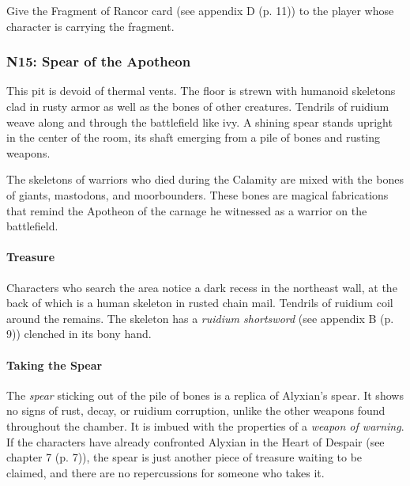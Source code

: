 \documentclass[a4paper, 11pt, bg=full, twocolumn, nooutline]{dndbook}
\begin{document}
Give the Fragment of Rancor card (see appendix D (p. 11)) to the player whose character is carrying the fragment.


\subsubsection{N15: Spear of the Apotheon}

\begin{DndReadAloud}
This pit is devoid of thermal vents. The floor is strewn with humanoid skeletons clad in rusty armor as well as the bones of other creatures. Tendrils of ruidium weave along and through the battlefield like ivy. A shining spear stands upright in the center of the room, its shaft emerging from a pile of bones and rusting weapons.
\end{DndReadAloud}

The skeletons of warriors who died during the Calamity are mixed with the bones of giants, mastodons, and moorbounders. These bones are magical fabrications that remind the Apotheon of the carnage he witnessed as a warrior on the battlefield.

\paragraph{Treasure}

Characters who search the area notice a dark recess in the northeast wall, at the back of which is a human skeleton in rusted chain mail. Tendrils of ruidium coil around the remains. The skeleton has a \textit{ruidium shortsword} (see appendix B (p. 9)) clenched in its bony hand.

\paragraph{Taking the Spear}

The \textit{spear} sticking out of the pile of bones is a replica of Alyxian's spear. It shows no signs of rust, decay, or ruidium corruption, unlike the other weapons found throughout the chamber. It is imbued with the properties of a \textit{weapon of warning}. If the characters have already confronted Alyxian in the Heart of Despair (see chapter 7 (p. 7)), the spear is just another piece of treasure waiting to be claimed, and there are no repercussions for someone who takes it.
\end{document}
